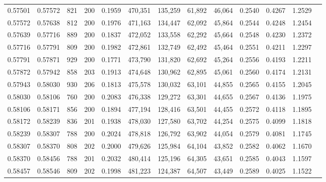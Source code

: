 \begin{tabular}{rrrrrrrrrrrrr}
0.57501 & 0.57572 &   821 & 200 &                                     0.1959 & 470,351 & 135,259 &  61,892 &  46,064 & 0.2540 & 0.4267 & 1.2529 \\
0.57572 & 0.57638 &   812 & 200 &                                     0.1976 & 471,163 & 134,447 &  62,092 &  45,864 & 0.2544 & 0.4248 & 1.2454 \\
0.57639 & 0.57716 &   889 & 200 &                                     0.1837 & 472,052 & 133,558 &  62,292 &  45,664 & 0.2548 & 0.4230 & 1.2372 \\
0.57716 & 0.57791 &   809 & 200 &                                     0.1982 & 472,861 & 132,749 &  62,492 &  45,464 & 0.2551 & 0.4211 & 1.2297 \\
0.57791 & 0.57871 &   929 & 200 &                                     0.1771 & 473,790 & 131,820 &  62,692 &  45,264 & 0.2556 & 0.4193 & 1.2211 \\
0.57872 & 0.57942 &   858 & 203 &                                     0.1913 & 474,648 & 130,962 &  62,895 &  45,061 & 0.2560 & 0.4174 & 1.2131 \\
0.57943 & 0.58030 &   930 & 206 &                                     0.1813 & 475,578 & 130,032 &  63,101 &  44,855 & 0.2565 & 0.4155 & 1.2045 \\
0.58030 & 0.58106 &   760 & 200 &                                     0.2083 & 476,338 & 129,272 &  63,301 &  44,655 & 0.2567 & 0.4136 & 1.1975 \\
0.58106 & 0.58171 &   856 & 200 &                                     0.1894 & 477,194 & 128,416 &  63,501 &  44,455 & 0.2572 & 0.4118 & 1.1895 \\
0.58172 & 0.58239 &   836 & 201 &                                     0.1938 & 478,030 & 127,580 &  63,702 &  44,254 & 0.2575 & 0.4099 & 1.1818 \\
0.58239 & 0.58307 &   788 & 200 &                                     0.2024 & 478,818 & 126,792 &  63,902 &  44,054 & 0.2579 & 0.4081 & 1.1745 \\
0.58307 & 0.58370 &   808 & 202 &                                     0.2000 & 479,626 & 125,984 &  64,104 &  43,852 & 0.2582 & 0.4062 & 1.1670 \\
0.58370 & 0.58456 &   788 & 201 &                                     0.2032 & 480,414 & 125,196 &  64,305 &  43,651 & 0.2585 & 0.4043 & 1.1597 \\
0.58457 & 0.58546 &   809 & 202 &                                     0.1998 & 481,223 & 124,387 &  64,507 &  43,449 & 0.2589 & 0.4025 & 1.1522 \\

\end{tabular}
